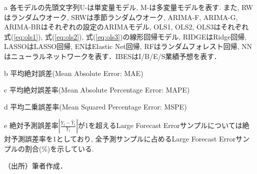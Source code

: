 \begin{threeparttable}
\begin{tablenotes}
\item[a] 各モデルの先頭文字列U-は単変量モデル, M-は多変量モデルを表す. また, RWはランダムウオーク, SRWは季節ランダムウオーク, ARIMA-F, ARIMA-G, ARIMA-BRはそれぞれ\cite*{foster1977quarterly, griffin1977time, brown1979univariate}の設定のARIMAモデル, OLS1, OLS2, OLS3はそれぞれ式(\ref{eq:ols1}), 式(\ref{eq:ols2}), 式(\ref{eq:ols3})の線形回帰モデル, RIDGEはRidge回帰, LASSOはLASSO回帰, ENはElastic Net回帰, RFはランダムフォレスト回帰, NNはニューラルネットワークを表す．IBESはI/B/E/S業績予想を表す．
\item[b] 平均絶対誤差(Mean Absolute Error: MAE)
\item[c] 平均絶対誤差率(Mean Absolute Percentage Error: MAPE)
\item[d] 平均二乗誤差率(Mean Squared Percentage Error: MSPE)
\item[e] 絶対予測誤差率$\left| \frac{Y_t -{\hat Y}_t}{Y_t} \right|$が1を超えるLarge Forecast Errorサンプルについては絶対予測誤差率を1としており, 全予測サンプルに占めるLarge Forecast Errorサンプルの割合(\%)を示している.
\item[] （出所）筆者作成． 
\end{tablenotes}
\end{threeparttable}